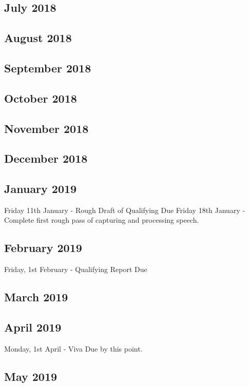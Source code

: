 \documentclass{article}
\begin{document}
	\subsection{July 2018}
	
	\subsection{August 2018}
	
	\subsection{September 2018}
	
	\subsection{October 2018}
	
	\subsection{November 2018}
	
	\subsection{December 2018}	
	
	\subsection{January 2019}
	Friday 11th January - Rough Draft of Qualifying Due
	Friday 18th January - Complete first rough pass of capturing and processing speech.
	
	\subsection{February 2019}
	Friday, 1st February - Qualifying Report Due
	
	\subsection{March 2019}
	
	\subsection{April 2019}
	Monday, 1st April - Viva Due by this point.
	\subsection{May 2019}
	
\end{document}
